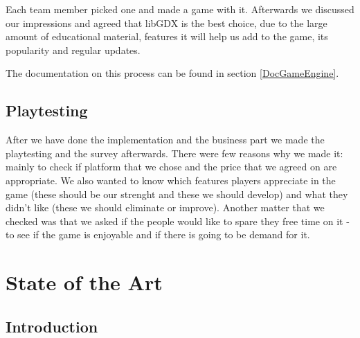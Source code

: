 \documentclass[12p]{article}
\begin{document}
Each team member picked one and made a game with it. Afterwards we discussed our impressions and agreed that libGDX is the best choice, due to the large amount of educational material, features it will help us add to the game, its popularity and regular updates.

The documentation on this process can be found in section \ref{DocGameEngine}.

\subsection{Playtesting}

After we have done the implementation and the business part we made the playtesting and  the survey afterwards. There were few reasons why we made it: mainly to check if platform that we chose and the price that we agreed on are appropriate. We also wanted to know which features players appreciate in the game (these should be our strenght and these we should develop) and what they didn't like (these we should eliminate or improve).  Another matter that we checked was that we asked if the people would like to spare they free time on it - to see if the game is enjoyable and if there is going to be demand for it.




\newpage
\section{State of the Art} \label{sec:StateOfTheArt}
\subsection{Introduction}


\end{document}
